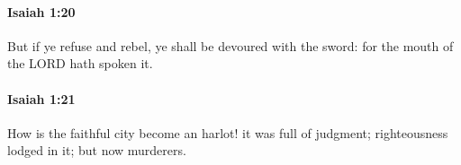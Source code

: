 		\paragraph{Isaiah 1:20} %
			\label{ISAIAH-1-20}

			But if ye refuse and rebel, ye shall be devoured with the sword: for the mouth of the LORD hath spoken it.


		\paragraph{Isaiah 1:21} %
			\label{ISAIAH-1-21}

			How is the faithful city become an harlot! it was full of judgment; righteousness lodged in it; but now murderers.


